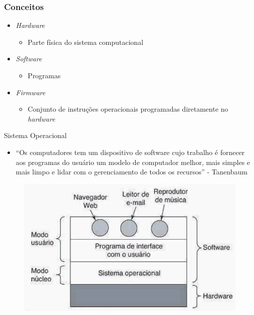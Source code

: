 \documentclass[aspectratio=169,
				xcolor=table]{beamer}
\begin{document}
	\begin{frame}
		\frametitle{Conceitos}
		\begin{itemize}
			\item \textit{Hardware}
			\begin{itemize}
				\item Parte física do sistema computacional
			\end{itemize}
			\vspace{1em}
			\item \textit{Software}
			\begin{itemize}
				\item Programas 
			\end{itemize}
			\vspace{1em}
			\item \textit{Firmware}
			\begin{itemize}
				\item Conjunto de instruções operacionais programadas diretamente no \textit{hardware}
			\end{itemize}
			\vspace{1em}
		\end{itemize}
	\end{frame}
	
	\begin{frame}{Sistema Operacional}
		\begin{itemize}
			\item ``Os computadores tem um dispositivo de software cujo trabalho é fornecer aos programas do usuário um modelo de computador melhor, mais simples e mais limpo e lidar com o gerenciamento de todos os recursos'' - Tanenbaum 			
		\end{itemize}
			\begin{figure}[hbtp]
	\centering
	\includegraphics[height=.55\textheight, keepaspectratio]{../figs/cap01/so}
	\end{figure}
	\end{frame}
	
\end{document}
